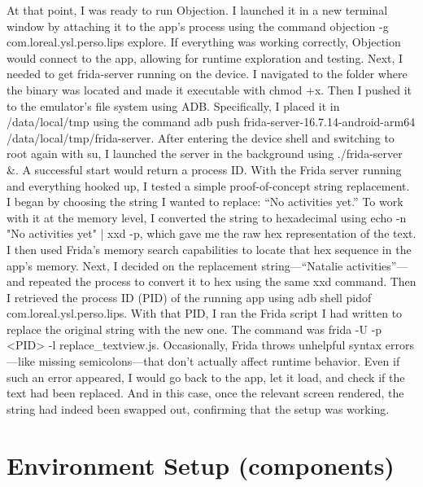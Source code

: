 At that point, I was ready to run Objection. I launched it in a new terminal window by attaching it to the app’s process using the command objection -g com.loreal.ysl.perso.lips explore. If everything was working correctly, Objection would connect to the app, allowing for runtime exploration and testing.
Next, I needed to get frida-server running on the device. I navigated to the folder where the binary was located and made it executable with chmod +x. Then I pushed it to the emulator’s file system using ADB. Specifically, I placed it in /data/local/tmp using the command adb push frida-server-16.7.14-android-arm64 /data/local/tmp/frida-server. After entering the device shell and switching to root again with su, I launched the server in the background using ./frida-server &. A successful start would return a process ID.
With the Frida server running and everything hooked up, I tested a simple proof-of-concept string replacement. I began by choosing the string I wanted to replace: “No activities yet.” To work with it at the memory level, I converted the string to hexadecimal using echo -n "No activities yet" | xxd -p, which gave me the raw hex representation of the text. I then used Frida’s memory search capabilities to locate that hex sequence in the app’s memory.
Next, I decided on the replacement string—“Natalie activities”—and repeated the process to convert it to hex using the same xxd command. Then I retrieved the process ID (PID) of the running app using adb shell pidof com.loreal.ysl.perso.lips. With that PID, I ran the Frida script I had written to replace the original string with the new one. The command was frida -U -p <PID> -l replace_textview.js. Occasionally, Frida throws unhelpful syntax errors—like missing semicolons—that don’t actually affect runtime behavior. Even if such an error appeared, I would go back to the app, let it load, and check if the text had been replaced. And in this case, once the relevant screen rendered, the string had indeed been swapped out, confirming that the setup was working.



\section{Environment Setup (components)}
